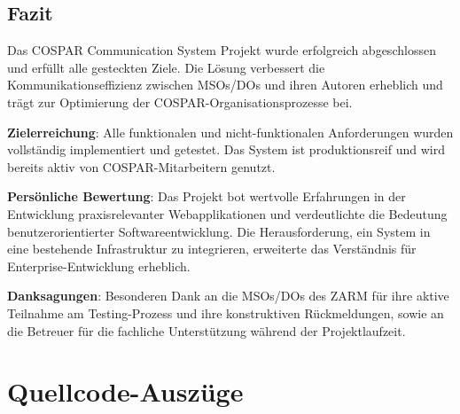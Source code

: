 \documentclass[11pt,a4paper]{article}
\begin{document}
\subsection{Fazit}
Das COSPAR Communication System Projekt wurde erfolgreich abgeschlossen und erfüllt alle gesteckten Ziele. Die Lösung verbessert die Kommunikationseffizienz zwischen MSOs/DOs und ihren Autoren erheblich und trägt zur Optimierung der COSPAR-Organisationsprozesse bei.

\textbf{Zielerreichung}: Alle funktionalen und nicht-funktionalen Anforderungen wurden vollständig implementiert und getestet. Das System ist produktionsreif und wird bereits aktiv von COSPAR-Mitarbeitern genutzt.

\textbf{Persönliche Bewertung}: Das Projekt bot wertvolle Erfahrungen in der Entwicklung praxisrelevanter Webapplikationen und verdeutlichte die Bedeutung benutzerorientierter Softwareentwicklung. Die Herausforderung, ein System in eine bestehende Infrastruktur zu integrieren, erweiterte das Verständnis für Enterprise-Entwicklung erheblich.

\textbf{Danksagungen}: Besonderen Dank an die MSOs/DOs des ZARM für ihre aktive Teilnahme am Testing-Prozess und ihre konstruktiven Rückmeldungen, sowie an die Betreuer für die fachliche Unterstützung während der Projektlaufzeit.

\appendix

\section{Quellcode-Auszüge}
\end{document}
